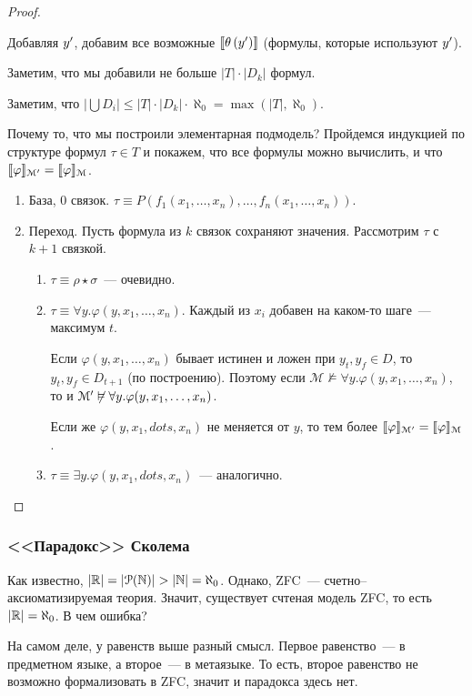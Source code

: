 \begin{proof}
\begin{enumerate}
\begin{enumerate}
            Добавляя $y^{\prime}$, добавим все возможные $\left\llbracket \theta \left( y^{\prime} \right) \right\rrbracket$ (формулы, которые используют $y^{\prime}$).
        \end{enumerate}
    \end{enumerate}
    Заметим, что мы добавили не больше $|T|\cdot |D_k|$ формул.

    Заметим, что $\left| \bigcup D_i \right| \leqslant |T| \cdot |D_k| \cdot \aleph_0 = \max\left( |T|,  \aleph_0 \right)$.

    Почему то, что мы построили элементарная подмодель? Пройдемся индукцией по структуре формул $\tau\in T$ и покажем, что все формулы можно вычислить, и что $\llbracket \varphi\rrbracket_{\mathcal{M}^{\prime}} = \llbracket \varphi\rrbracket_{\mathcal{M}}$.
    \begin{enumerate}
        \item База, 0 связок. $\tau\equiv P(f_1(x_1, \dots,x_n), \dots, f_n(x_1, \dots, x_n))$.
        \item Переход. Пусть формула из $k$ связок сохраняют значения. Рассмотрим $\tau$ с $k + 1$ связкой.
        \begin{enumerate}
            \item $\tau \equiv \rho \star \sigma$~--- очевидно.
            \item $\tau \equiv \forall y.\varphi(y, x_1, \dots, x_n)$. Каждый из $x_i$ добавен на каком-то шаге~--- максимум $t$.

            Если $\varphi(y, x_1, \dots, x_n)$ бывает истинен и ложен при $y_t, y_f \in D$, то $y_t, y_f \in D_{t+1}$ (по построению). Поэтому если $\mathcal{M} \not\vDash \forall y. \varphi(y, x_1, \dots, x_n)$, то и $\mathcal{M}^{\prime} \not\vDash \forall y. \varphi(y, x_1, \dots, x_n)$.

            Если же $\varphi(y, x_1, dots, x_n)$ не меняется от $y$, то тем более $\llbracket \varphi\rrbracket_{\mathcal M^{\prime}} = \llbracket \varphi\rrbracket_{\mathcal M}$.

            \item $\tau\equiv \exists y. \varphi(y, x_1, dots, x_n)$~--- аналогично.
        \end{enumerate}
    \end{enumerate}
\end{proof}

\subsubsection{<<Парадокс>> Сколема}
Как известно, $|\mathbb{R}| = |\mathcal P (\mathbb{N})| > |\mathbb{N}| = \aleph_0$. Однако, ZFC~--- счетно--аксиоматизируемая теория. Значит, существует счтеная модель ZFC, то есть $|\mathbb{R}| = \aleph_0$. В чем ошибка?

На самом деле, у равенств выше разный смысл. Первое равенство~--- в предметном языке, а второе~--- в метаязыке.
То есть, второе равенство не возможно формализовать в ZFC, значит и парадокса здесь нет.